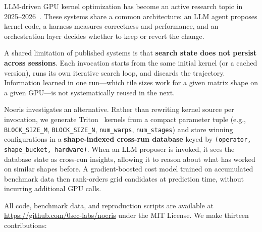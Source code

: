 \documentclass[11pt]{article}
\begin{document}
LLM-driven GPU kernel optimization has become an active research topic in
2025--2026~\citep{autokernel,kernelskill,cudal1,cudaagent,kernelfoundry}. These
systems share a common architecture: an LLM agent proposes kernel code, a
harness measures correctness and performance, and an orchestration layer decides
whether to keep or revert the change.

A shared limitation of published systems is that \textbf{search state does not
persist across sessions}. Each invocation starts from the same initial kernel (or
a cached version), runs its own iterative search loop, and discards the
trajectory. Information learned in one run---which tile sizes work for a given
matrix shape on a given GPU---is not systematically reused in the next.

Noeris investigates an alternative. Rather than rewriting kernel source per
invocation, we generate Triton~\citep{triton} kernels from a compact parameter tuple (e.g.,
\texttt{BLOCK\_SIZE\_M}, \texttt{BLOCK\_SIZE\_N}, \texttt{num\_warps},
\texttt{num\_stages}) and store winning configurations in a \textbf{shape-indexed
cross-run database} keyed by \texttt{(operator, shape\_bucket, hardware)}. When
an LLM proposer is invoked, it sees the database state as cross-run insights,
allowing it to reason about what has worked on similar shapes before. A
gradient-boosted cost model trained on accumulated benchmark data then
rank-orders grid candidates at prediction time, without incurring additional GPU
calls.

All code, benchmark data, and reproduction scripts are available at
\url{https://github.com/0sec-labs/noeris} under the MIT License. We make thirteen contributions:
\end{document}
